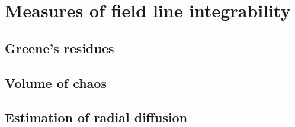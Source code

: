 \chapter{Measures of field line integrability}

\section{Greene's residues}

\section{Volume of chaos}

\section{Estimation of radial diffusion}
